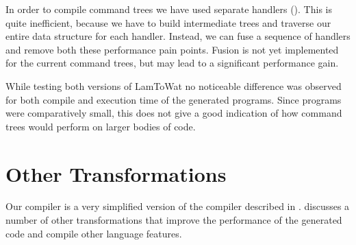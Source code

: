 In order to compile command trees we have used separate handlers (). This is quite inefficient, because we have to build intermediate trees and traverse our entire data structure for each handler. Instead, we can fuse \autocite{DBLP:conf/mpc/WuS15} a sequence of handlers and remove both these performance pain points. Fusion is not yet implemented for the current command trees, but may lead to a significant performance gain.

While testing both versions of LamToWat no noticeable difference was observed for both compile and execution time of the generated programs. Since programs were comparatively small, this does not give a good indication of how command trees would perform on larger bodies of code.

\section{\label{section:othert}Other Transformations}
Our compiler is a very simplified version of the compiler described in  \autocite{DBLP:books/daglib/0022396}. \citeauthor{DBLP:books/daglib/0022396} discusses a number of other transformations that improve the performance of the generated code and compile other language features.

